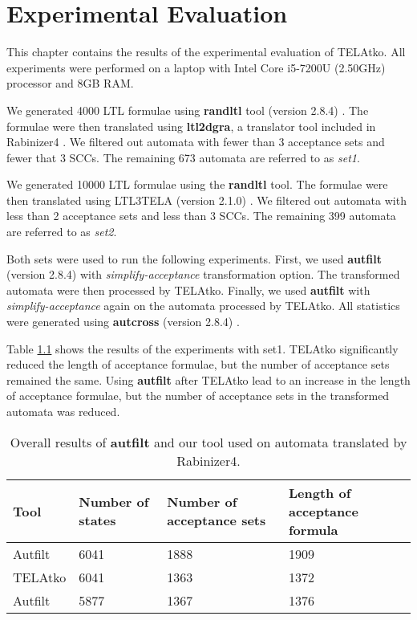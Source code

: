 \documentclass[
  digital, %
  twoside, %
  table,   %
  lof,     %
  lot,     %
]{fithesis3}
\begin{document}
\chapter{Experimental Evaluation}
This chapter contains the results of the experimental evaluation of TELAtko. All experiments were performed on a laptop with Intel Core i5-7200U (2.50GHz) processor and 8GB RAM. 

We generated 4000 LTL \cite{ltl} formulae using \textbf{randltl} tool (version 2.8.4) \cite{randltl}. The formulae were then translated using \textbf{ltl2dgra}, a translator tool included in Rabinizer4 \cite{rabinizer}. We filtered out automata with fewer than 3 acceptance sets and fewer that 3 SCCs. The remaining 673 automata are referred to as \emph{set1}.

We generated 10000 LTL formulae using the \textbf{randltl} tool. The formulae were then translated using LTL3TELA (version 2.1.0) \cite{ltl3tela}. We filtered out automata with less than 2 acceptance sets and less than 3 SCCs. The remaining 399 automata are referred to as \emph{set2}.

Both sets were used to run the following experiments. First, we used \textbf{autfilt} (version 2.8.4) \cite{spot} with \emph{simplify-acceptance} transformation option. The transformed automata were then processed by TELAtko. Finally, we used \textbf{autfilt} with \emph{simplify-acceptance} again on the automata processed by TELAtko. All statistics were generated using \textbf{autcross} (version 2.8.4) \cite{spot}.

Table \ref{tab:rabinizer4} shows the results of the experiments with set1. TELAtko significantly reduced the length of acceptance formulae, but the number of acceptance sets remained the same. Using \textbf{autfilt} after TELAtko lead to an increase in the length of acceptance formulae, but the number of acceptance sets in the transformed automata was reduced.

\begin{table}[h]
  \begin{tabularx}{\textwidth}{lXXX}
    \toprule
    Tool & Number of states & Number of acceptance sets & Length of acceptance formula  \\
    \midrule
    Autfilt & 6041 & 1888 & 1909 \\
    TELAtko & 6041 & 1363 & 1372 \\
    Autfilt & 5877 & 1367 & 1376 \\    
    \bottomrule
  \end{tabularx}
  \caption{Overall results of \textbf{autfilt} and our tool used on automata translated by Rabinizer4.}
  \label{tab:rabinizer4}
\end{table}
\end{document}

